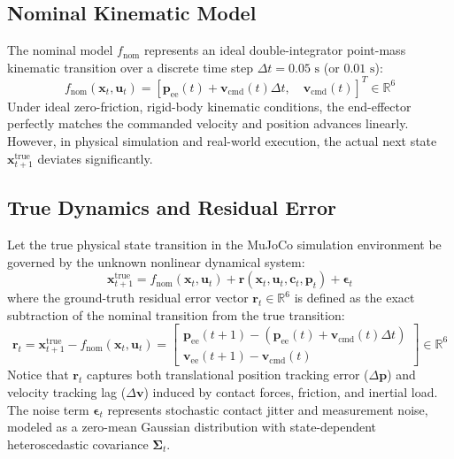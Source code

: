 \documentclass[10pt,a4paper]{article}
\begin{document}
\subsection{Nominal Kinematic Model}
The nominal model $f_{\mathrm{nom}}$ represents an ideal double-integrator point-mass kinematic transition over a discrete time step $\Delta t = 0.05\text{ s}$ (or $0.01\text{ s}$):
\begin{equation}
f_{\mathrm{nom}}(\mathbf{x}_t, \mathbf{u}_t) = [\mathbf{p}_{\mathrm{ee}}(t) + \mathbf{v}_{\mathrm{cmd}}(t) \Delta t, \quad \mathbf{v}_{\mathrm{cmd}}(t)]^T \in \mathbb{R}^6
\label{eq:nominal_model}
\end{equation}
Under ideal zero-friction, rigid-body kinematic conditions, the end-effector perfectly matches the commanded velocity and position advances linearly. However, in physical simulation and real-world execution, the actual next state $\mathbf{x}_{t+1}^{\mathrm{true}}$ deviates significantly.

\subsection{True Dynamics and Residual Error}
Let the true physical state transition in the MuJoCo simulation environment be governed by the unknown nonlinear dynamical system:
\begin{equation}
\mathbf{x}_{t+1}^{\mathrm{true}} = f_{\mathrm{nom}}(\mathbf{x}_t, \mathbf{u}_t) + \mathbf{r}(\mathbf{x}_t, \mathbf{u}_t, \mathbf{c}_t, \mathbf{p}_t) + \bm{\epsilon}_t
\label{eq:true_dynamics}
\end{equation}
where the ground-truth residual error vector $\mathbf{r}_t \in \mathbb{R}^6$ is defined as the exact subtraction of the nominal transition from the true transition:
\begin{equation}
\mathbf{r}_t = \mathbf{x}_{t+1}^{\mathrm{true}} - f_{\mathrm{nom}}(\mathbf{x}_t, \mathbf{u}_t) = \begin{bmatrix} \mathbf{p}_{\mathrm{ee}}(t+1) - (\mathbf{p}_{\mathrm{ee}}(t) + \mathbf{v}_{\mathrm{cmd}}(t) \Delta t) \\ \mathbf{v}_{\mathrm{ee}}(t+1) - \mathbf{v}_{\mathrm{cmd}}(t) \end{bmatrix} \in \mathbb{R}^6
\label{eq:residual_def}
\end{equation}
Notice that $\mathbf{r}_t$ captures both translational position tracking error ($\Delta \mathbf{p}$) and velocity tracking lag ($\Delta \mathbf{v}$) induced by contact forces, friction, and inertial load. The noise term $\bm{\epsilon}_t$ represents stochastic contact jitter and measurement noise, modeled as a zero-mean Gaussian distribution with state-dependent heteroscedastic covariance $\bm{\Sigma}_t$.
\end{document}
